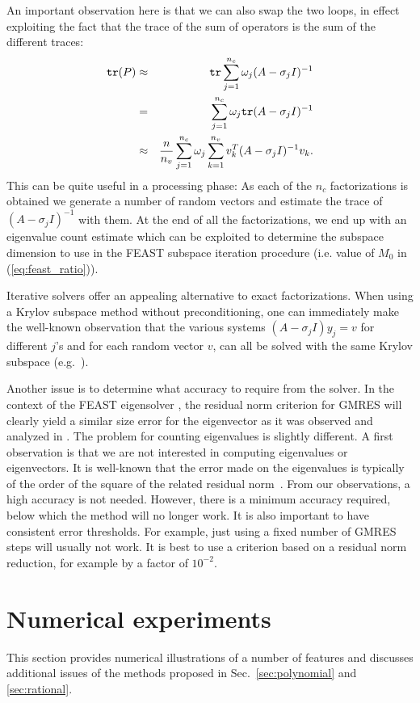 \documentclass[12pt]{article}		\usepackage{tabls,multirow}
\def\trace{\mbox{\tt tr}}
\def\inv{^{-1}}\def\backw{{\bf B}}\def\diag{\mbox{Diag}\,}
\begin{document}
An important observation here is that we can also swap the two loops,
in effect exploiting the fact that the trace of the sum of operators
is the sum of the different traces:
\begin{eqnarray*} 
  \trace (P ) &\approx& \trace \sum_{j=1}^{n_c} \omega_j (A - \sigma_j I)\inv \\
  &=& \sum_{j=1}^{n_c}  \omega_j \trace (A - \sigma_j I)\inv \\
  &\approx& \frac{n}{n_v} 
  \sum_{j=1}^{n_c} \omega_j \sum_{k=1}^{n_v} v_k^T (A - \sigma_j I)\inv v_k
  . \end{eqnarray*}
This can be quite useful in a processing phase: As each of the 
$n_c$ factorizations is obtained we generate a number of random vectors
and estimate the trace of $(A-\sigma_j I)\inv$ with them. At the end of all
the factorizations, we end up with an eigenvalue count estimate 
which can be exploited to determine the subspace dimension to use
in the FEAST subspace iteration procedure (i.e. value of $M_0$ in (\ref{eq:feast_ratio})).

Iterative solvers offer an appealing alternative to exact factorizations.
When using a Krylov subspace method without preconditioning,
one can immediately make the well-known observation that the
various systems $(A-\sigma_j I) y_j  = v$ for different $j$'s 
and for each random  vector $v$, can all be solved with the same Krylov
subspace (e.g.~\cite{LopezSimoncini06}).  

Another issue is to determine what accuracy to require from the
solver. In the context of the FEAST eigensolver  \cite{FEASTsolver}, 
the residual norm
criterion for GMRES will clearly yield a similar size error for the
eigenvector as it was observed and analyzed in \cite{Kramer-al-FEAST-2013,Tang13}. The
problem for counting eigenvalues is slightly different. A first
observation is that we are not interested in computing eigenvalues or
eigenvectors.  It is well-known that the error made on the eigenvalues is
typically of the order of the square of the related residual
norm~\cite{Saad-book3}. From our observations, a high accuracy is not
needed. However, there is a minimum accuracy required, below which the
method will no longer work. It is also important to have consistent
error thresholds. For example, just using a fixed number of GMRES
steps will usually not work. It is best to use a criterion based on a
residual norm reduction, for example by a factor of $10^{-2}$.



\section{Numerical experiments}
\label{sec:numtests}
This section provides numerical illustrations of a 
number of features and discusses additional issues of the
methods proposed in Sec.~\ref{sec:polynomial} and
\ref{sec:rational}.
\end{document}
